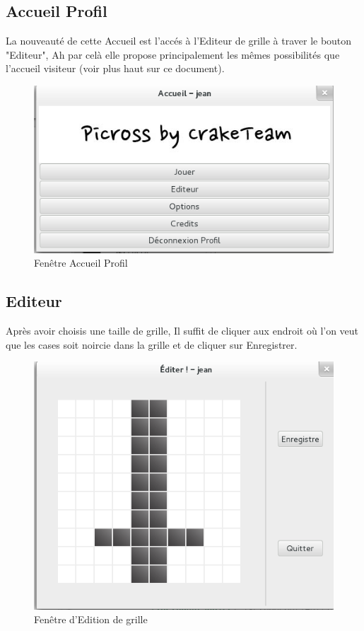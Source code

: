 \documentclass[11pt]{article}
\begin{document}
\subsection{Accueil Profil}

La nouveauté de cette Accueil est l'accés à l'Editeur de grille à traver le bouton "Editeur", Ah par celà elle propose principalement les mêmes possibilités que l'accueil visiteur (voir plus haut sur ce document).

	\begin{figure}[!ht]
		\centering
		\includegraphics{./Screenshot/AccueilProfil.png}
		\caption{Fenêtre Accueil Profil}
	\end{figure}


\subsection{Editeur}

Après avoir choisis une taille de grille, Il suffit de cliquer aux endroit où l'on veut que les cases soit noircie dans la grille et de cliquer sur Enregistrer.

	\begin{figure}[!ht]
		\centering
		\includegraphics{./Screenshot/Editeur.png}
		\caption{Fenêtre d'Edition de grille}
	\end{figure}
\end{document}
